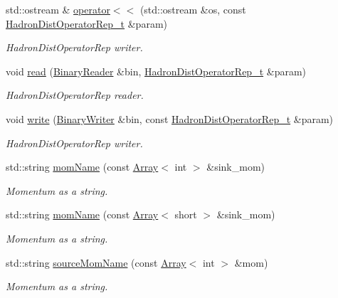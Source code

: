 \begin{DoxyCompactItemize}
std\+::ostream \& \mbox{\hyperlink{namespaceHadron_a4ff4eac2687982e6a251bf3524940b01}{operator$<$$<$}} (std\+::ostream \&os, const \mbox{\hyperlink{classHadron_1_1HadronDistOperatorRep__t}{Hadron\+Dist\+Operator\+Rep\+\_\+t}} \&param)
\begin{DoxyCompactList}\small\item\em Hadron\+Dist\+Operator\+Rep writer. \end{DoxyCompactList}\item 
void \mbox{\hyperlink{namespaceHadron_adeba574c3428db28a2e7054d5f4d32d6}{read}} (\mbox{\hyperlink{classADATIO_1_1BinaryReader}{Binary\+Reader}} \&bin, \mbox{\hyperlink{classHadron_1_1HadronDistOperatorRep__t}{Hadron\+Dist\+Operator\+Rep\+\_\+t}} \&param)
\begin{DoxyCompactList}\small\item\em Hadron\+Dist\+Operator\+Rep reader. \end{DoxyCompactList}\item 
void \mbox{\hyperlink{namespaceHadron_a9edaeb80eb507096c7529be211efa667}{write}} (\mbox{\hyperlink{classADATIO_1_1BinaryWriter}{Binary\+Writer}} \&bin, const \mbox{\hyperlink{classHadron_1_1HadronDistOperatorRep__t}{Hadron\+Dist\+Operator\+Rep\+\_\+t}} \&param)
\begin{DoxyCompactList}\small\item\em Hadron\+Dist\+Operator\+Rep writer. \end{DoxyCompactList}\item 
std\+::string \mbox{\hyperlink{namespaceHadron_ad1ac646aa2d410cc55e4b11c925867a6}{mom\+Name}} (const \mbox{\hyperlink{classXMLArray_1_1Array}{Array}}$<$ int $>$ \&sink\+\_\+mom)
\begin{DoxyCompactList}\small\item\em Momentum as a string. \end{DoxyCompactList}\item 
std\+::string \mbox{\hyperlink{namespaceHadron_aaac56034a899893bfbd130cdd0427018}{mom\+Name}} (const \mbox{\hyperlink{classXMLArray_1_1Array}{Array}}$<$ short $>$ \&sink\+\_\+mom)
\begin{DoxyCompactList}\small\item\em Momentum as a string. \end{DoxyCompactList}\item 
std\+::string \mbox{\hyperlink{namespaceHadron_addad39b9d17263485541d757bb712420}{source\+Mom\+Name}} (const \mbox{\hyperlink{classXMLArray_1_1Array}{Array}}$<$ int $>$ \&mom)
\begin{DoxyCompactList}\small\item\em Momentum as a string. \end{DoxyCompactList}\item 

\end{DoxyCompactItemize}
